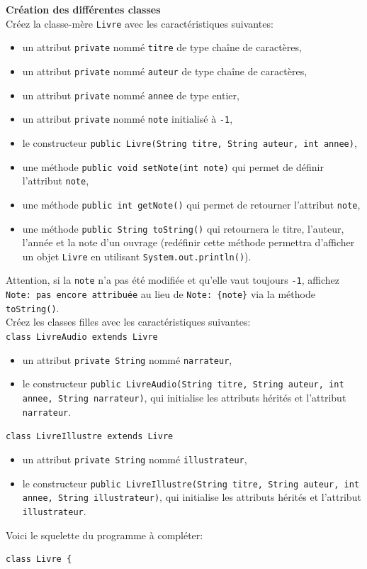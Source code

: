 \begin{Exercice}[20 minutes] \textbf{Création des différentes classes}\\
Créez la classe-mère \lstinline{Livre} avec les caractéristiques suivantes:
\begin{itemize}
	\item un attribut \lstinline{private} nommé \lstinline{titre} de type chaîne de caractères,
	\item un attribut \lstinline{private} nommé \lstinline{auteur} de type chaîne de caractères,
	\item un attribut \lstinline{private} nommé \lstinline{annee} de type entier,
	\item un attribut \lstinline{private} nommé \lstinline{note} initialisé à \lstinline{-1},
	\item le constructeur \lstinline{public Livre(String titre, String auteur, int annee)},
	\item une méthode \lstinline{public void setNote(int note)} qui permet de définir l'attribut \lstinline{note},
	\item une méthode \lstinline{public int getNote()} qui permet de retourner l'attribut \lstinline{note},
	\item une méthode \lstinline{public String toString()} qui retournera le titre, l'auteur, l'année et la note d'un ouvrage (redéfinir cette méthode permettra d'afficher un objet \lstinline{Livre} en utilisant \lstinline{System.out.println()}). \\
\end{itemize}

Attention, si la \lstinline{note} n'a pas été modifiée et qu'elle vaut toujours \lstinline{-1}, affichez \texttt{Note: pas encore attribuée} au lieu de \texttt{Note: \{note\}} via la méthode \lstinline{toString()}. \\

Créez les classes filles avec les caractéristiques suivantes:\\
\lstinline{class LivreAudio extends Livre}
\begin{itemize}
	\item un attribut \lstinline{private String} nommé \lstinline{narrateur},
	\item le constructeur \lstinline{public LivreAudio(String titre, String auteur, int annee, String narrateur)}, qui initialise les attributs hérités et l'attribut \lstinline{narrateur}.
\end{itemize}
\lstinline{class LivreIllustre extends Livre}
\begin{itemize}
	\item un attribut \lstinline{private String} nommé \lstinline{illustrateur},
	\item le constructeur \lstinline{public LivreIllustre(String titre, String auteur, int annee, String illustrateur)}, qui initialise les attributs hérités et l'attribut \lstinline{illustrateur}.
\end{itemize}
Voici le squelette du programme à compléter:
\begin{lstlisting}
class Livre {
	

\end{lstlisting}
\end{Exercice}
